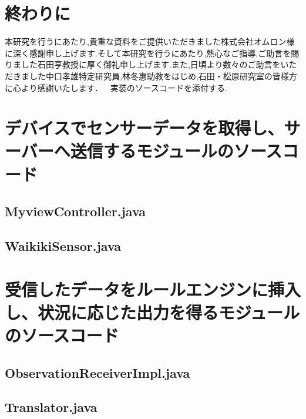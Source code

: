 \documentclass{kuisthesis}			%
\begin{document}
\section{終わりに}

\acknowledgments				%
本研究を行うにあたり,貴重な資料をご提供いただきました株式会社オムロン様に深く感謝申し上げます.そして本研究を行うにあたり,熱心なご指導,ご助言を賜りました石田亨教授に厚く御礼申し上げます.また,日頃より数々のご助言をいただきました中口孝雄特定研究員,林冬惠助教をはじめ,石田・松原研究室の皆様方に心より感謝いたします．

\nocite{*}

\Appendix[付録]
実装のソースコードを添付する.

\section{デバイスでセンサーデータを取得し、サーバーへ送信するモジュールのソースコード}
\subsection{MyviewController.java}


\subsection{WaikikiSensor.java}


\section{受信したデータをルールエンジンに挿入し、状況に応じた出力を得るモジュールのソースコード}

\subsection{ObservationReceiverImpl.java}


\subsection{Translator.java}

\end{document}

